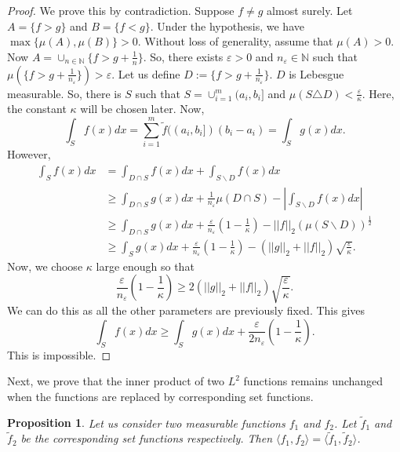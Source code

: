 \documentclass[reqno,12pt]{amsart}
\theoremstyle{plain}
\newtheorem{proposition}{Proposition}
\theoremstyle{definition}
\let\tilde\widetilde
\begin{document}
\begin{proof}
    We prove this by contradiction. Suppose $f \neq g$ almost surely. Let $A= \{ f >g \}$ and $B= \{ f< g\}$. Under the hypothesis, we have $\max\{ \mu(A), \mu(B) \} >0$. Without loss of generality, assume that $\mu(A)>0$. Now $A= \cup_{n \in \mathbb{N}}\{ f> g+ \frac{1}{n} \}$. So, there exists $\varepsilon >0$ and $n_{\varepsilon} \in \mathbb{N}$ such that $\mu(\{ f> g+ \frac{1}{n_{\varepsilon}} \}) > \varepsilon$. Let us define $D:=\{ f> g+ \frac{1}{n_{\varepsilon}} \}$. $D$ is Lebesgue measurable. So, there is $S$ such that $S= \cup_{i=1}^{m}(a_{i},b_{i}]$ and $\mu(S \triangle D) < \frac{\varepsilon}{\kappa}$. Here, the constant $\kappa$ will be chosen later. Now, 
    \[
    \int_{S} f(x) dx= \sum_{i=1}^{m} \tilde{f}((a_{i},b_{i}])(b_{i}-a_{i})= \int_{S} g(x)dx.
    \]
    However, 
    \begin{equation}
        \begin{split}
          \int_{S} f(x) dx&= \int_{D\cap S} f(x) dx + \int_{S \backslash D} f(x) dx\\
          &\ge \int_{D\cap S} g(x) dx + \frac{1}{n_{\varepsilon}} \mu(D\cap S) - \left| \int_{S\backslash D} f(x) dx\right|\\
          & \ge \int_{D\cap S} g(x) dx + \frac{\varepsilon}{n_{\varepsilon}}\left(1- \frac{1}{\kappa} \right) - ||f||_{2}(\mu(S \backslash D))^{\frac{1}{2}}\\
          & \ge \int_{S} g(x) dx + \frac{\varepsilon}{n_{\varepsilon}}\left(1- \frac{1}{\kappa} \right) - \left(||g||_{2}+||f||_{2}\right) \sqrt{\frac{\varepsilon}{\kappa}}.
        \end{split}
    \end{equation}
    Now, we choose $\kappa$ large enough so that 
    \[
      \frac{\varepsilon}{n_{\varepsilon}}\left(1- \frac{1}{\kappa} \right) \ge 2 \left(||g||_{2}+||f||_{2}\right) \sqrt{\frac{\varepsilon}{\kappa}}.
    \]
    We can do this as all the other parameters are previously fixed. This gives 
    \[
    \int_{S} f(x) dx \ge \int_{S} g(x) dx + \frac{\varepsilon}{2n_{\varepsilon}}\left(1- \frac{1}{\kappa} \right).
    \]
    This is impossible.
\end{proof}
Next, we prove that the inner product of two $L^2$ functions remains unchanged when the functions are replaced by corresponding set functions. 
\begin{proposition}\label{prop:inner}
    Let us consider two measurable functions $f_{1}$ and $f_{2}$. Let $\tilde{f}_{1}$ and $\tilde{f}_{2}$ be the corresponding set functions respectively. Then $\langle f_{1}, f_{2} \rangle = \langle \tilde{f}_{1}, \tilde{f}_{2} \rangle $.
\end{proposition}
\end{document}

